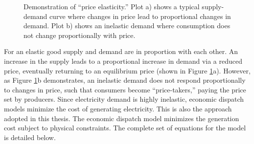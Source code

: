 \begin{figure}[H]
  \centering
  \resizebox{\columnwidth}{!}{}
  \caption{Demonstration of ``price elasticity.'' Plot a) shows a typical supply-demand curve where changes in price lead to proportional changes in demand. Plot b) shows an inelastic demand where consumption does not change proportionally with price.}
  \label{fig:inelastic}
\end{figure}

For an elastic good supply and demand are in proportion with each other. An increase in the 
supply leads to a proportional increase in demand via a reduced price, eventually returning to 
an equilibrium price (shown in Figure \ref{fig:inelastic}a). However, as Figure 
\ref{fig:inelastic}b demonstrates, an inelastic demand does not respond proportionally to 
changes in price, such that consumers become ``price-takers,'' paying the price set by 
producers. Since electricity demand is highly inelastic, economic dispatch models minimize the 
cost of generating electricity. This is also the approach adopted in this thesis. The economic dispatch model minimizes the generation cost subject to physical constraints. The complete set of equations for the model is detailed below.
